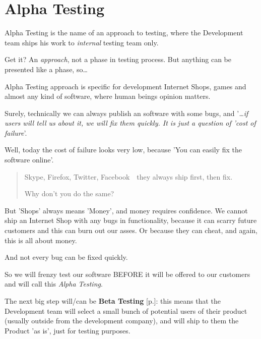 \section{Alpha Testing}
\label{sec:Alpha Testing}

Alpha Testing is the name of an approach to testing, where the Development team ships his work to \emph{internal} testing team only.

Get it? An \emph{approach}, not a phase in testing process. But anything can be presented like a phase, so\ldots

Alpha Testing approach is specific for development Internet Shops, games and almost any kind of software, where human beings opinion matters.

Surely, technically we can always publish an software with some bugs, and '\textit{…if users will tell us about it, we will fix them quickly. It is just a question of 'cost of failure}'. 

Well, today the cost of failure looks very low, because 'You can easily fix the software online'.

\begin{quote}
Skype, Firefox, Twitter, Facebook~\textemdash~they always ship first, then fix.

Why don't you do the same?
\end{quote}

But 'Shops' always means 'Money', and money requires confidence. We cannot ship an Internet Shop with any bugs in functionality, because it can scarry future customers and this can burn out our asses. Or because they can cheat, and again, this is all about money.

And not every bug can be fixed quickly.

So we will frenzy test our software BEFORE it will be offered to our customers and will call this \emph{Alpha Testing}.

The next big step will/can be \textbf{Beta Testing} [p.\pageref{sec:Beta Testing}]: this means that the Development team will select a small bunch of potential users of their product (usually outside from the development company), and will ship to them the Product 'as is', just for testing purposes.


